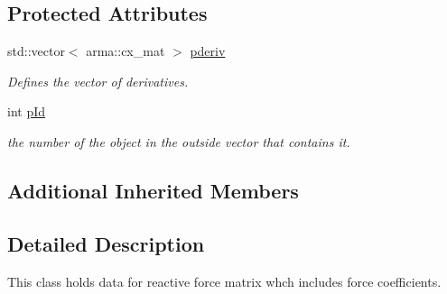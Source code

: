 \subsection*{Protected Attributes}
\begin{DoxyCompactItemize}
\item 
std\-::vector$<$ arma\-::cx\-\_\-mat $>$ \hyperlink{classosea_1_1ofreq_1_1mat_force_react_a827cccb59204d98738a4d98b78942b45}{pderiv}
\begin{DoxyCompactList}\small\item\em Defines the vector of derivatives. \end{DoxyCompactList}\item 
int \hyperlink{classosea_1_1ofreq_1_1mat_force_react_a890a6fbcf9900d4a37ff05533f350f50}{p\-Id}
\begin{DoxyCompactList}\small\item\em the number of the object in the outside vector that contains it. \end{DoxyCompactList}\end{DoxyCompactItemize}
\subsection*{Additional Inherited Members}


\subsection{Detailed Description}
This class holds data for reactive force matrix whch includes force coefficients. 

